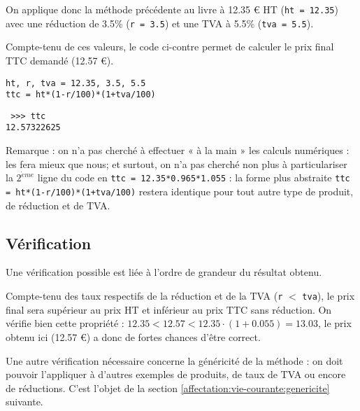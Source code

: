 On applique donc la méthode précédente au livre à 12.35 \euro{} HT (\texttt{ht = 12.35}) 
avec une réduction de 3.5\% (\texttt{r = 3.5}) et une TVA à 5.5\% (\texttt{tva = 5.5}).

\noindent\begin{minipage}{7cm}
Compte-tenu de ces valeurs, le code \python{} ci-contre
permet de calculer le prix final TTC demandé (12.57 \euro).
\end{minipage}
\hfill
\begin{minipage}{8cm}
\begin{lstlisting}[caption=\textbf{prix d'un livre}]
ht, r, tva = 12.35, 3.5, 5.5
ttc = ht*(1-r/100)*(1+tva/100)
\end{lstlisting}
\tt\footnotesize
>>> ttc\\
12.57322625
\end{minipage}
\vspace*{2mm}

Remarque : on n'a pas cherché à effectuer « à la main » les calculs numériques :
\python{} les fera mieux que nous; et surtout, on n'a pas cherché non plus à 
particulariser la $2^{\grave eme}$ ligne du code en \texttt{ttc = 12.35*0.965*1.055} :
la forme plus abstraite \texttt{ttc = ht*(1-r/100)*(1+tva/100)} restera identique pour 
tout autre type de produit, de réduction et de TVA. 

\subsection{Vérification}\label{affectation:vie-courante:verification}
Une vérification possible est liée à l'ordre de grandeur du résultat obtenu.

Compte-tenu des taux respectifs de la réduction et de la TVA (\texttt{r} $<$ \texttt{tva}),
le prix final sera supérieur au prix HT et inférieur au prix TTC sans réduction.
On vérifie bien cette propriété : $12.35 < 12.57 < 12.35\cdot(1+0.055) = 13.03$, le
prix obtenu ici (12.57 \euro) a donc de fortes chances d'être correct.

Une autre vérification nécessaire concerne la généricité de la méthode : on doit 
pouvoir l'appliquer à d'autres exemples de produits, de taux de TVA ou encore de réductions.
C'est l'objet de la section \ref{affectation:vie-courante:genericite} suivante.

